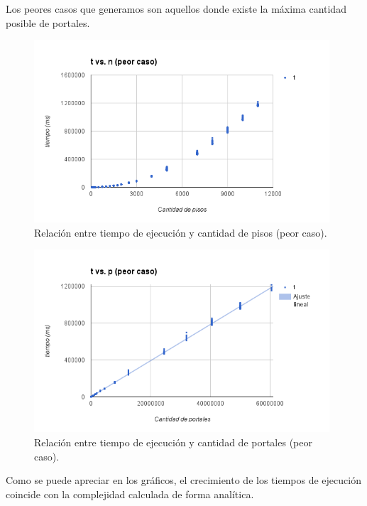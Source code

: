 Los peores casos que generamos son aquellos donde existe la máxima cantidad posible de portales.

 \begin{figure}[h!]
   \begin{center}
 	\includegraphics[width=11cm]{imagenes/ej1/tvsn-peorcaso.png}
	\caption{Relación entre tiempo de ejecución y cantidad de pisos (peor caso).}
	\label{tvsn-peorcaso}
   \end{center}
 \end{figure}
\begin{figure}[h!]
   \begin{center}
 	\includegraphics[width=11cm]{imagenes/ej1/tvsp-peorcaso.png}
	\caption{Relación entre tiempo de ejecución y cantidad de portales (peor caso).}
	\label{tvsp-peorcaso}
   \end{center}
 \end{figure}

 
 Como se puede apreciar en los gráficos, el crecimiento de los tiempos de ejecución coincide con la complejidad calculada de forma analítica.
